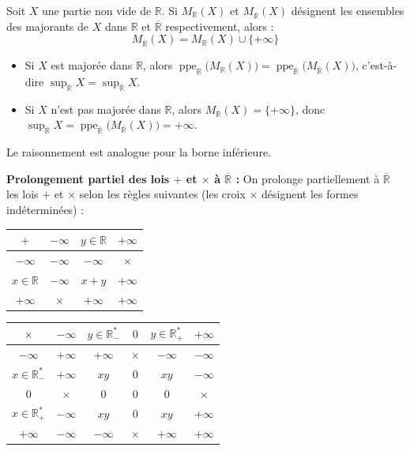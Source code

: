 \documentclass[a4paper,11pt]{article}
\newcommand{\R}{\mathbb{R}}
\DeclareMathOperator{\ppe}{ppe}
\begin{document}
\begin{demonstration}
Soit $X$ une partie non vide de $\R$. Si $M_{\R}(X)$ et $M_{\overline{\R}}(X)$ désignent les ensembles des majorants de $X$ dans $\R$ et $\overline{\R}$ respectivement, alors :
\[
M_{\overline{\R}}(X) = M_{\R}(X) \cup \{ +\infty \}
\]
\begin{itemize}
    \item Si $X$ est majorée dans $\R$, alors $\ppe_{\R}\big(M_{\R}(X)\big) = \ppe_{\overline{\R}}\big(M_{\overline{\R}}(X)\big)$, c'est-à-dire $\sup_{\R} X = \sup_{\overline{\R}} X$.
    \item Si $X$ n'est pas majorée dans $\R$, alors $M_{\overline{\R}}(X) = \{ +\infty \}$, donc $\sup_{\overline{\R}} X = \ppe_{\overline{\R}}\big(M_{\overline{\R}}(X)\big) = +\infty$.
\end{itemize}
Le raisonnement est analogue pour la borne inférieure.
\end{demonstration}

\textbf{Prolongement partiel des lois $+$ et $\times$ à $\overline{\R}$ :}
On prolonge partiellement à $\overline{\R}$ les lois $+$ et $\times$ selon les règles suivantes (les croix $\times$ désignent les formes indéterminées) :

\begin{center}
\renewcommand{\arraystretch}{1.4}
\begin{tabular}{c|c|c|c}
$+$ & $-\infty$ & $y \in \R$ & $+\infty$ \\
\hline
$-\infty$ & $-\infty$ & $-\infty$ & $\times$ \\
\hline
$x \in \R$ & $-\infty$ & $x + y$ & $+\infty$ \\
\hline
$+\infty$ & $\times$ & $+\infty$ & $+\infty$ \\
\end{tabular}
\qquad\qquad
\begin{tabular}{c|c|c|c|c|c}
$\times$ & $-\infty$ & $y \in \R_-^*$ & $0$ & $y \in \R_+^*$ & $+\infty$ \\
\hline
$-\infty$ & $+\infty$ & $+\infty$ & $\times$ & $-\infty$ & $-\infty$ \\
\hline
$x \in \R_-^*$ & $+\infty$ & $xy$ & $0$ & $xy$ & $-\infty$ \\
\hline
$0$ & $\times$ & $0$ & $0$ & $0$ & $\times$ \\
\hline
$x \in \R_+^*$ & $-\infty$ & $xy$ & $0$ & $xy$ & $+\infty$ \\
\hline
$+\infty$ & $-\infty$ & $-\infty$ & $\times$ & $+\infty$ & $+\infty$ \\
\end{tabular}
\end{center}
\end{document}
